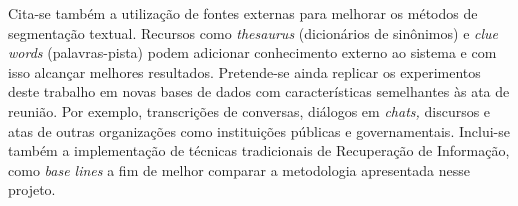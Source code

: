 Cita-se também a utilização de fontes externas para melhorar os métodos de segmentação textual. Recursos como \textit{thesaurus} (dicionários de sinônimos) e \textit{clue words} (palavras-pista) podem adicionar conhecimento externo ao sistema e com isso alcançar melhores resultados. 
%
Pretende-se ainda replicar os experimentos deste trabalho em novas bases de dados com características semelhantes às ata de reunião. Por exemplo, transcrições de conversas, diálogos em \textit{chats,} discursos e atas de outras organizações como instituições públicas e governamentais.  
Inclui-se também a implementação de técnicas tradicionais de Recuperação de Informação, como \textit{base lines} a fim de melhor comparar a metodologia apresentada nesse projeto. 



















